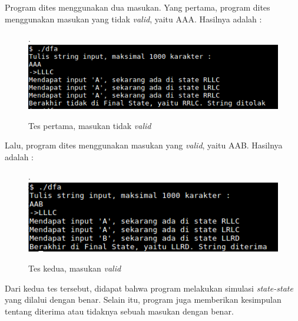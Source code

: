 Program dites menggunakan dua masukan. Yang pertama, program dites menggunakan masukan yang tidak \textit{valid}, yaitu AAA. Hasilnya adalah :
\begin{figure}[h!]
  \centering
  \caption{Tes pertama, masukan tidak \textit{valid}}.
  \includegraphics[width=350pt]{AAA.png}
\end{figure}

Lalu, program dites menggunakan masukan yang \textit{valid}, yaitu AAB. Hasilnya adalah :
\begin{figure}[h!]
  \centering
  \caption{Tes kedua, masukan \textit{valid}}.
  \includegraphics[width=350pt]{AAB.png}
\end{figure}

Dari kedua tes tersebut, didapat bahwa program melakukan simulasi \textit{state-state} yang dilalui dengan benar. Selain itu, program juga memberikan kesimpulan tentang diterima atau tidaknya sebuah masukan dengan benar.
